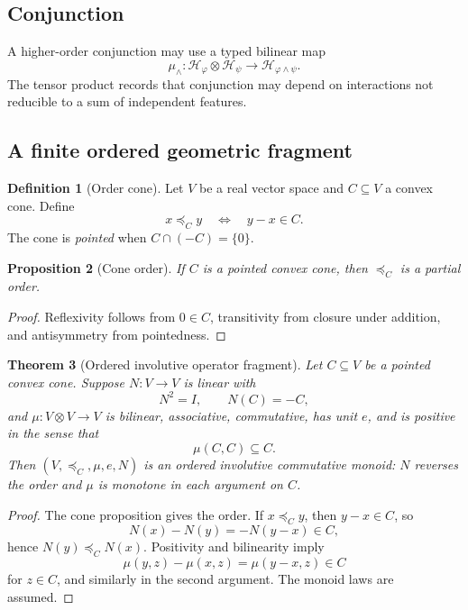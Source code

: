 \documentclass[11pt]{article}
\newtheorem{theorem}{Theorem}[section]
\newtheorem{proposition}[theorem]{Proposition}
\theoremstyle{definition}
\newtheorem{definition}[theorem]{Definition}
\theoremstyle{remark}
\newcommand{\Lat}{\mathcal H}
\begin{document}
\subsection{Conjunction}

A higher-order conjunction may use a typed bilinear map
\[
\mu_{\wedge}:\Lat_\varphi\otimes\Lat_\psi\to\Lat_{\varphi\wedge\psi}.
\]
The tensor product records that conjunction may depend on interactions not reducible to a sum of independent features.

\subsection{A finite ordered geometric fragment}

\begin{definition}[Order cone]
Let \(V\) be a real vector space and \(C\subseteq V\) a convex cone. Define
\[
x\preceq_C y
\quad\Longleftrightarrow\quad
y-x\in C.
\]
The cone is \emph{pointed} when \(C\cap(-C)=\{0\}\).
\end{definition}

\begin{proposition}[Cone order]
If \(C\) is a pointed convex cone, then \(\preceq_C\) is a partial order.
\end{proposition}

\begin{proof}
Reflexivity follows from \(0\in C\), transitivity from closure under addition, and antisymmetry from pointedness.
\end{proof}

\begin{theorem}[Ordered involutive operator fragment]
Let \(C\subseteq V\) be a pointed convex cone. Suppose \(N:V\to V\) is linear with
\[
N^2=I,
\qquad
N(C)=-C,
\]
and \(\mu:V\otimes V\to V\) is bilinear, associative, commutative, has unit \(e\), and is positive in the sense that
\[
\mu(C,C)\subseteq C.
\]
Then \((V,\preceq_C,\mu,e,N)\) is an ordered involutive commutative monoid: \(N\) reverses the order and \(\mu\) is monotone in each argument on \(C\).
\end{theorem}

\begin{proof}
The cone proposition gives the order. If \(x\preceq_C y\), then \(y-x\in C\), so
\[
N(x)-N(y)=-N(y-x)\in C,
\]
hence \(N(y)\preceq_C N(x)\). Positivity and bilinearity imply
\[
\mu(y,z)-\mu(x,z)=\mu(y-x,z)\in C
\]
for \(z\in C\), and similarly in the second argument. The monoid laws are assumed.
\end{proof}
\end{document}
